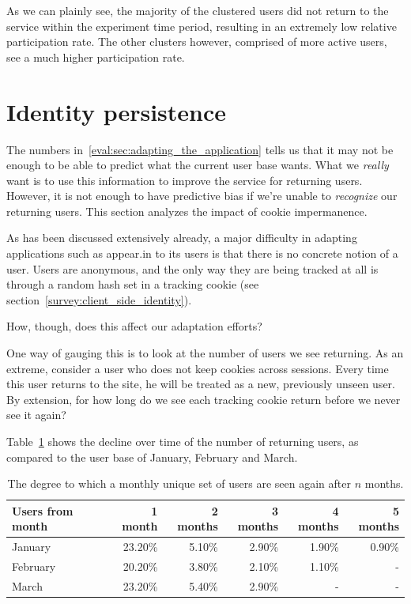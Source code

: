As we can plainly see, the majority of the clustered users did not return to the service within the experiment time period, resulting in an extremely low relative participation rate. The other clusters however, comprised of more active users, see a much higher participation rate.

\section{Identity persistence}
\label{eval:sec:identity_persistence}

The numbers in~\ref{eval:sec:adapting_the_application} tells us that it may not be enough to be able to predict what the current user base wants. What we \emph{really} want is to use this information to improve the service for returning users. However, it is not enough to have predictive bias if we're unable to \emph{recognize} our returning users. This section analyzes the impact of cookie impermanence.

As has been discussed extensively already, a major difficulty in adapting applications such as appear.in to its users is that there is no concrete notion of a user. Users are anonymous, and the only way they are being tracked at all is through a random hash set in a tracking cookie (see section~\ref{survey:client_side_identity}).

How, though, does this affect our adaptation efforts?

One way of gauging this is to look at the number of users we see returning. As an extreme, consider a user who does not keep cookies across sessions. Every time this user returns to the site, he will be treated as a new, previously unseen user. By extension, for how long do we see each tracking cookie return before we never see it again?

Table~\ref{tab:returning_users} shows the decline over time of the number of returning users, as compared to the user base of January, February and March.

\begin{table}[h]
  \centering
  \begin{tabular}{|l|rrrrr|}
    \hline
    Users from month & 1 month & 2 months & 3 months & 4 months & 5 months \\ \hline
    January          & 23.20\% & 5.10\%   & 2.90\%   & 1.90\%   & 0.90\%   \\
    February         & 20.20\% & 3.80\%   & 2.10\%   & 1.10\%   & -        \\
    March            & 23.20\% & 5.40\%   & 2.90\%   & -        & -        \\ \hline
  \end{tabular}
  \caption{The degree to which a monthly unique set of users are seen again after $n$ months.}
  \label{tab:returning_users}
\end{table}

